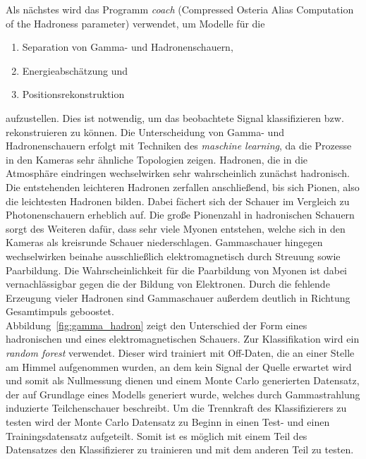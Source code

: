 Als nächstes wird das Programm \textit{coach} (Compressed Osteria Alias
Computation of the Hadroness parameter) verwendet, um Modelle für die
\begin{enumerate}
  \item Separation von Gamma- und Hadronenschauern,
  \item Energieabschätzung und
  \item Positionsrekonstruktion
\end{enumerate}
aufzustellen. Dies ist notwendig, um das beobachtete Signal klassifizieren bzw.
rekonstruieren zu können. Die Unterscheidung von Gamma- und Hadronenschauern
erfolgt mit Techniken des \textit{maschine learning}, da die Prozesse in den
Kameras sehr ähnliche Topologien zeigen. Hadronen, die
in die Atmosphäre eindringen wechselwirken sehr wahrscheinlich zunächst hadronisch.
Die entstehenden leichteren Hadronen zerfallen anschließend, bis sich Pionen, also
die leichtesten Hadronen bilden. Dabei fächert sich der Schauer im Vergleich zu
Photonenschauern erheblich auf. Die große Pionenzahl in hadronischen Schauern sorgt
des Weiteren dafür, dass sehr viele Myonen entstehen, welche sich in den Kameras als
kreisrunde Schauer niederschlagen.
Gammaschauer hingegen wechselwirken beinahe ausschließlich elektromagnetisch durch
Streuung sowie Paarbildung. Die Wahrscheinlichkeit für die Paarbildung von Myonen
ist dabei vernachlässigbar gegen die der Bildung von Elektronen. Durch die fehlende
Erzeugung vieler Hadronen sind Gammaschauer außerdem deutlich in Richtung Gesamtimpuls
geboostet. \\
Abbildung~\ref{fig:gamma_hadron} zeigt den Unterschied der Form eines
hadronischen und eines elektromagnetischen Schauers. Zur Klassifikation wird ein
\textit{random forest} verwendet. Dieser wird trainiert mit Off-Daten, die an
einer Stelle am Himmel aufgenommen wurden, an dem kein Signal der Quelle
erwartet wird und somit als Nullmessung dienen und einem Monte Carlo generierten
Datensatz, der auf Grundlage eines Modells generiert wurde, welches durch
Gammastrahlung induzierte Teilchenschauer beschreibt. Um die Trennkraft des
Klassifizierers zu testen wird der Monte Carlo Datensatz zu Beginn in einen
Test- und einen Trainingsdatensatz aufgeteilt. Somit ist es möglich mit einem
Teil des Datensatzes den Klassifizierer zu trainieren und mit dem anderen Teil
zu testen.


